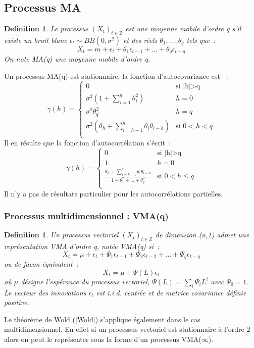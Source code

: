 \documentclass[11pt]{scrartcl} %
\newtheorem{Def}[theorem]{Definition}
\newcommand{\Xt}{\left(X_t\right)_{t\in\mathbb{Z}}}
\begin{document}
\subsection{Processus MA}
\begin{Def}
Le processus $\Xt$ est une moyenne mobile d'ordre q s'il existe un bruit blanc $\epsilon_t\sim BB(0,\sigma^2)$ et des réels $\theta_1,...,\theta_q$ tels que~:~
$$
X_t=m+\epsilon_t+\theta_1\epsilon_{t-1}+...+\theta_q\epsilon_{t-q}
$$ 
On note MA(q) une moyenne mobile d'ordre q.
\end{Def}
Un processus MA(q) est stationnaire, la fonction d'autocovariance est ~:
$$
\gamma(h)=\left\{\begin{array}{cc}
0 & \textrm{si |h|>q}\\
\sigma^2\left(1+\sum_{i=1}^q\theta^2_i\right) & h=0\\
\sigma^2 \theta^2_q & h=q\\
\sigma^2\left(\theta_h+\sum_{i=h+1}^q\theta_i\theta_{i-h}\right) & \textrm{si }0<h<q\\
\end{array}
\right.
$$
Il en résulte que la fonction d'autocorrélation s'écrit~:
$$
\gamma(h)=\left\{\begin{array}{cc}
0 & \textrm{si |h|>q}\\
1 & h=0\\
\frac{\theta_h+\sum_{i=h+1}^q\theta_i\theta_{i-h}}{1+\theta_1^2+...+\theta_q^2} & \textrm{si } 0<h\leq q\\
\end{array}
\right.
$$
Il n'y a pas de résultats particulier pour les autocorrélations partielles.
\subsubsection{Processus multidimensionnel : VMA(q)}
\begin{Def}
Un processus vectoriel $\Xt$ de dimension (n,1) admet une représentation VMA d'ordre q, notée VMA(q) si~:
$$
X_t = \mu + \epsilon_t +\Psi_1\epsilon_{t-1}+\Psi_2\epsilon_{t-2}+...+ \Psi_q\epsilon_{t-q}
$$
ou de façon équivalent~:
$$
X_t = \mu+\Psi(L)\epsilon_t
$$
où $\mu$ désigne l'espérance du processus vectoriel, $\Psi(L)=\sum_i\Psi_iL^i$ avec $\Psi_0=1$. Le vecteur des innovations $\epsilon_t$ est i.i.d. centrée et de matrice covariance définie positive.
\end{Def}


Le théorème de Wold (\ref{Wold}) s'applique également dans le cas multidimensionnel. En effet si un processus vectoriel est stationnaire à l'ordre 2 alors on peut le représenter sous la forme d'un processus VMA($\infty$).
\end{document}
